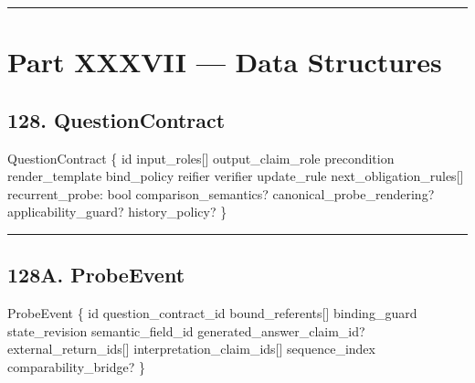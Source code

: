 \documentclass[
]{article}
\newenvironment{Shaded}{}{}
\newcommand{\NormalTok}[1]{#1}
\begin{document}
\begin{center}\rule{0.5\linewidth}{0.5pt}\end{center}

\section{Part XXXVII --- Data
Structures}\label{part-xxxvii-data-structures}

\subsection{128. QuestionContract}\label{questioncontract}

\begin{Shaded}
\begin{Highlighting}[]
\NormalTok{QuestionContract \{}
\NormalTok{    id}
\NormalTok{    input\_roles[]}
\NormalTok{    output\_claim\_role}
\NormalTok{    precondition}
\NormalTok{    render\_template}
\NormalTok{    bind\_policy}
\NormalTok{    reifier}
\NormalTok{    verifier}
\NormalTok{    update\_rule}
\NormalTok{    next\_obligation\_rules[]}
\NormalTok{    recurrent\_probe: bool}
\NormalTok{    comparison\_semantics?}
\NormalTok{    canonical\_probe\_rendering?}
\NormalTok{    applicability\_guard?}
\NormalTok{    history\_policy?}
\NormalTok{\}}
\end{Highlighting}
\end{Shaded}

\begin{center}\rule{0.5\linewidth}{0.5pt}\end{center}


\subsection{128A. ProbeEvent}\label{probeevent}

\begin{Shaded}
\begin{Highlighting}[]
\NormalTok{ProbeEvent \{}
\NormalTok{    id}
\NormalTok{    question\_contract\_id}
\NormalTok{    bound\_referents[]}
\NormalTok{    binding\_guard}
\NormalTok{    state\_revision}
\NormalTok{    semantic\_field\_id}
\NormalTok{    generated\_answer\_claim\_id?}
\NormalTok{    external\_return\_ids[]}
\NormalTok{    interpretation\_claim\_ids[]}
\NormalTok{    sequence\_index}
\NormalTok{    comparability\_bridge?}
\NormalTok{\}}
\end{Highlighting}
\end{Shaded}
\end{document}

